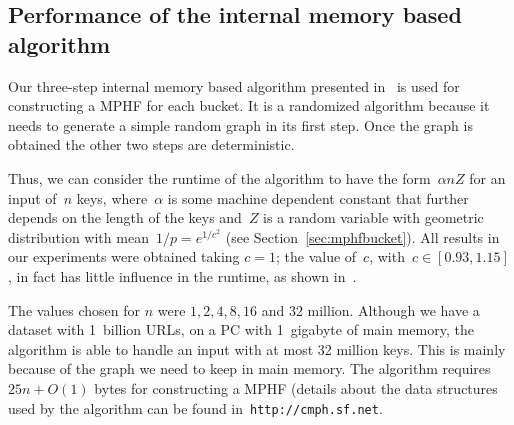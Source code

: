 \vspace{-2mm}
\subsection{Performance of the internal memory based algorithm}
\label{sec:intern-memory-algor}


Our three-step internal memory based algorithm presented in~\cite{bkz05}
is used for constructing a MPHF for each bucket.
It is a randomized algorithm because it needs to generate a simple random graph
in its first step. 
Once the graph is obtained the other two steps are deterministic. 

Thus, we can consider the runtime of the algorithm to have the form~$\alpha
nZ$ for an input of~$n$ keys, where~$\alpha$ is some machine dependent
constant that further depends on the length of the keys and~$Z$ is a random
variable with geometric distribution with mean~$1/p=e^{1/c^2}$ (see
Section~\ref{sec:mphfbucket}).  All results in our experiments were obtained
taking $c=1$; the value of~$c$, with~$c\in[0.93,1.15]$, in fact has little
influence in the runtime, as shown in~\cite{bkz05}.

The values chosen for $n$ were $1, 2, 4, 8, 16$ and $32$ million.
Although we have a dataset with 1~billion URLs, on a PC with
1~gigabyte of main memory, the algorithm is able
to handle an input with at most 32 million keys.
This is mainly because of the graph we need to keep in main memory.
The algorithm requires $25n + O(1)$ bytes for constructing 
a MPHF (details about the data structures used by the algorithm can
be found in~\texttt{http://cmph.sf.net}.

